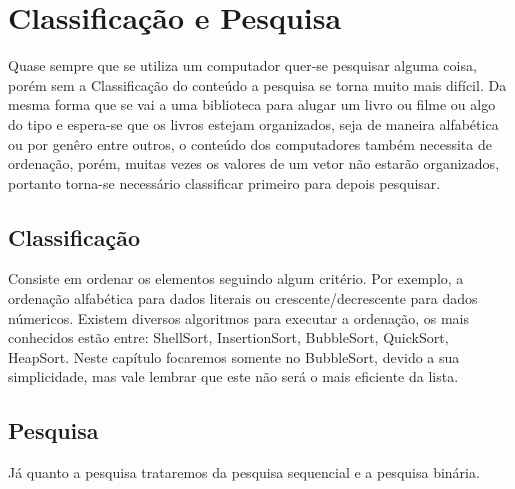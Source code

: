 \chapter{Classificação e Pesquisa}
Quase sempre que se utiliza um computador quer-se pesquisar alguma coisa, porém sem a Classificação do conteúdo a pesquisa se torna muito mais difícil. Da mesma forma que se vai a uma biblioteca para alugar um livro ou filme ou algo do tipo e espera-se que os livros estejam organizados, seja de maneira alfabética ou por genêro entre outros, o conteúdo dos computadores também necessita de ordenação, porém, muitas vezes os valores de um vetor não estarão organizados, portanto torna-se necessário classificar primeiro para depois pesquisar.
\section{Classificação}
Consiste em ordenar os elementos seguindo algum critério. Por exemplo, a ordenação alfabética para dados literais ou crescente/decrescente para dados númericos. Existem diversos algoritmos para executar a ordenação, os mais conhecidos estão entre: ShellSort, InsertionSort, BubbleSort, QuickSort, HeapSort. Neste capítulo focaremos somente no BubbleSort, devido a sua simplicidade, mas vale lembrar que este não será o mais eficiente da lista.
\section{Pesquisa}
Já quanto a pesquisa trataremos da pesquisa sequencial e a pesquisa binária.